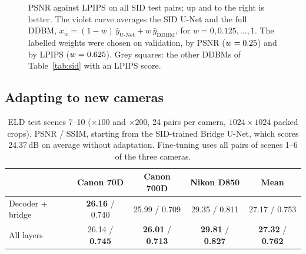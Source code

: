 \begin{figure}[tb]
\centering
{}
\caption{PSNR against LPIPS on all \SIDTESTPAIRS{} SID test pairs; up and to the right is better. The violet curve averages the SID U-Net and the full DDBM, $x_w=(1-w)\,\hat y_{\text{U-Net}}+w\,\hat y_{\text{DDBM}}$, for $w=0, 0.125, \dots, 1$. The labelled weights were chosen on validation, by PSNR ($w=0.25$) and by LPIPS ($w=0.625$). Grey squares: the other DDBMs of Table~\ref{tab:sid} with an LPIPS score.}
\label{fig:blend}
\end{figure}

\subsection{Adapting to new cameras}
\label{sec:eldres}

\begin{table}[t]
\centering
\caption{ELD test scenes 7--10 ($\times100$ and $\times200$, 24 pairs per camera, $1024\times1024$ packed crops). PSNR / SSIM, starting from the SID-trained Bridge U-Net, which scores 24.37\,dB on average without adaptation. Fine-tuning uses all pairs of scenes 1--6 of the three cameras.}
\label{tab:eld}
\small
\begin{tabular}{@{}lcccc@{}}
\toprule
 & Canon 70D & Canon 700D & Nikon D850 & Mean \\
\midrule
Decoder + bridge & \textbf{26.16} / 0.740 & 25.99 / 0.709 & 29.35 / 0.811 & 27.17 / 0.753 \\
All layers & 26.14 / \textbf{0.745} & \textbf{26.01} / \textbf{0.713} & \textbf{29.81} / \textbf{0.827} & \textbf{27.32} / \textbf{0.762} \\
\bottomrule
\end{tabular}
\end{table}

